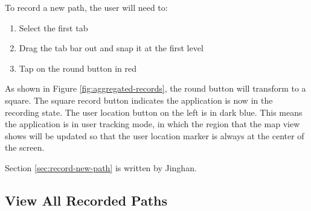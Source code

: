 \documentclass[12pt,a4paper]{article}
\begin{document}
            To record a new path, the user will need to:
            \begin{enumerate}
                \item Select the first tab
                \item Drag the tab bar out and snap it at the first level
                \item Tap on the round button in red
            \end{enumerate}
            As shown in Figure \ref{fig:aggregated-records}, the round button will transform to a square. The square record button indicates the application is now in the recording state. The user location button on the left is in dark blue. This means the application is in user tracking mode, in which the region that the map view shows will be updated so that the user location marker is always at the center of the screen.
            
            \footnotesize
            Section \ref{sec:record-new-path} is written by Jinghan.
            \normalsize
        
        
        \subsection{View All Recorded Paths} %
            \label{sec:view-all-recorded-paths}
\end{document}

